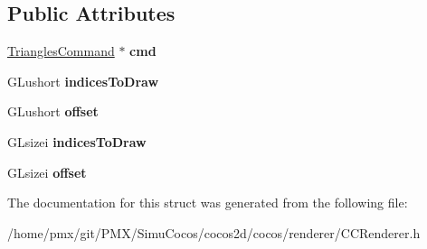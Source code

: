 \subsection*{Public Attributes}
\begin{DoxyCompactItemize}
\item 
\mbox{\label{structRenderer_1_1TriBatchToDraw_a712acc76bfbdcc7af84b6259fc621c76}} 
\hyperlink{classTrianglesCommand}{Triangles\+Command} $\ast$ {\bfseries cmd}
\item 
\mbox{\label{structRenderer_1_1TriBatchToDraw_adcee612792ab138c3e26df5d8f0c9ce8}} 
G\+Lushort {\bfseries indices\+To\+Draw}
\item 
\mbox{\label{structRenderer_1_1TriBatchToDraw_a61f30a2883a0f649bdac8bfd0b0bc3df}} 
G\+Lushort {\bfseries offset}
\item 
\mbox{\label{structRenderer_1_1TriBatchToDraw_ab6f6ac93b77845602c223b1b18cd7f6e}} 
G\+Lsizei {\bfseries indices\+To\+Draw}
\item 
\mbox{\label{structRenderer_1_1TriBatchToDraw_af609eeb29d8f21706c7bf076e0681c42}} 
G\+Lsizei {\bfseries offset}
\end{DoxyCompactItemize}


The documentation for this struct was generated from the following file\+:\begin{DoxyCompactItemize}
\item 
/home/pmx/git/\+P\+M\+X/\+Simu\+Cocos/cocos2d/cocos/renderer/C\+C\+Renderer.\+h\end{DoxyCompactItemize}
